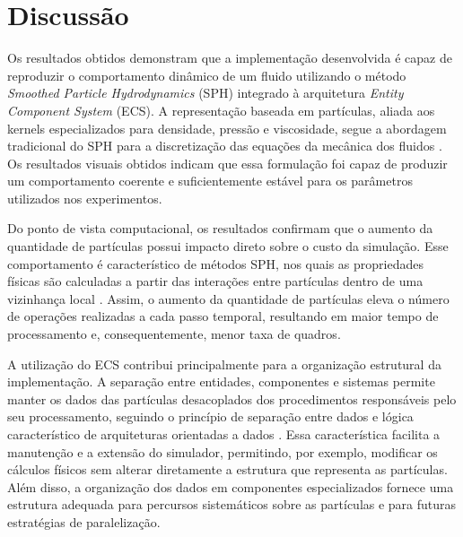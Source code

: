\section{Discussão}
\label{sec:discussao}


Os resultados obtidos demonstram que a implementação desenvolvida é capaz de
reproduzir o comportamento dinâmico de um fluido utilizando o método
\textit{Smoothed Particle Hydrodynamics} (SPH) integrado à arquitetura
\textit{Entity Component System} (ECS). A representação baseada em partículas,
aliada aos kernels especializados para densidade, pressão e viscosidade, segue
a abordagem tradicional do SPH para a discretização das equações da mecânica
dos fluidos \cite{monaghan2005,muller2003particle}. Os resultados visuais
obtidos indicam que essa formulação foi capaz de produzir um comportamento
coerente e suficientemente estável para os parâmetros utilizados nos
experimentos.

Do ponto de vista computacional, os resultados confirmam que o aumento da
quantidade de partículas possui impacto direto sobre o custo da simulação. Esse
comportamento é característico de métodos SPH, nos quais as propriedades
físicas são calculadas a partir das interações entre partículas dentro de uma
vizinhança local \cite{monaghan2005,koschier2020sph}. Assim, o aumento da
quantidade de partículas eleva o número de operações realizadas a cada passo
temporal, resultando em maior tempo de processamento e, consequentemente, menor
taxa de quadros.

A utilização do ECS contribui principalmente para a organização estrutural da
implementação. A separação entre entidades, componentes e sistemas permite
manter os dados das partículas desacoplados dos procedimentos responsáveis pelo
seu processamento, seguindo o princípio de separação entre dados e lógica
característico de arquiteturas orientadas a dados \cite{bilas2002}. Essa
característica facilita a manutenção e a extensão do simulador, permitindo, por
exemplo, modificar os cálculos físicos sem alterar diretamente a estrutura que
representa as partículas. Além disso, a organização dos dados em componentes
especializados fornece uma estrutura adequada para percursos sistemáticos sobre
as partículas e para futuras estratégias de paralelização.


